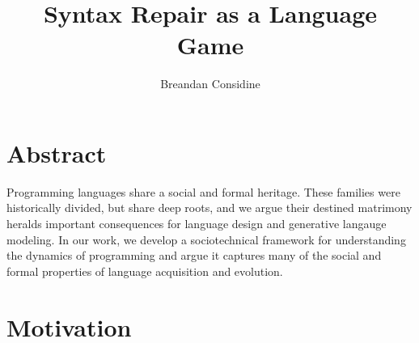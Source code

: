 \documentclass[sigplan,screen]{acmart}
\begin{document}
\title{Syntax Repair as a Language Game}

\author{Breandan Considine}

%


\renewcommand{\shortauthors}{Considine et al.}


\maketitle

\section{Abstract}

Programming languages share a social and formal heritage. These families were historically divided, but share deep roots, and we argue their destined matrimony heralds important consequences for language design and generative langauge modeling. In our work, we develop a sociotechnical framework for understanding the dynamics of programming and argue it captures many of the social and formal properties of language acquisition and evolution.

\section{Motivation}

\end{document}
